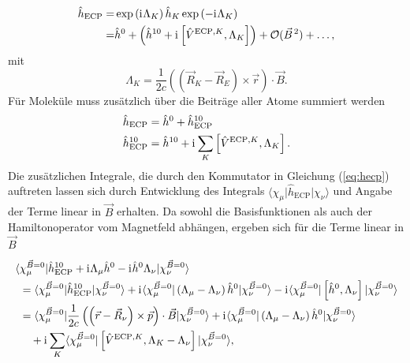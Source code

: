 	\begin{equation}
	\begin{aligned}
	\hat{h}_{\textrm{ECP}}=&\exp\left(\mathrm{i}\mkern1mu\Lambda_K\right)\hat{h}_K\exp\left(-\mathrm{i}\mkern1mu\Lambda_K\right)\\
	=&\hat{h}^0+\left(\hat{h}^{10}+\mathrm{i}\mkern1mu\left[\hat{V}^{\textrm{ECP},K},\Lambda_K\right]\right)+\mathcal{O}(\vec{B}^{\,2})+\dotsc,
	\end{aligned}
	\end{equation}
	mit
	\begin{equation}
	\Lambda_K=\frac{1}{2c}\left(\left(\vec{R}_K-\vec{R}_E\right)\times\vec{r}\right)\cdot\vec{B}.
	\end{equation}
	Für Moleküle muss zusätzlich über die Beiträge aller Atome summiert werden
	\begin{equation}\label{eq:hecp}
	\begin{aligned}
	&\hat{h}_{\textrm{ECP}}=\hat{h}^0+\hat{h}_{\textrm{ECP}}^{10}\\
	&\hat{h}_{\textrm{ECP}}^{10}=\hat{h}^{10}+\mathrm{i}\mkern1mu\sum_K\left[\hat{V}^{\textrm{ECP},K},\Lambda_K\right].
	\end{aligned}
	\end{equation}	 
	Die zusätzlichen Integrale, die durch den Kommutator in Gleichung (\ref{eq:hecp}) auftreten lassen sich durch Entwicklung des Integrals $\langle\chi_\mu\vert\hat{h}_{\textrm{ECP}}\vert\chi_\nu\rangle$ und Angabe der Terme linear in $\vec{B}$ erhalten. Da sowohl die Basisfunktionen als auch der Hamiltonoperator vom Magnetfeld abhängen, ergeben sich für die Terme linear in $\vec{B}$
	
	\begin{equation}\label{eq:linearinb}
	\begin{aligned}
	\langle &\chi_\mu^{\vec{B}=0}\vert\hat{h}_{\textrm{ECP}}^{10}+\mathrm{i}\mkern1mu\Lambda_\mu\hat{h}^0-\mathrm{i}\mkern1mu\hat{h}^0\Lambda_\nu\vert\chi_\nu^{\vec{B}=0}\rangle\\
	&=\langle \chi_\mu^{\vec{B}=0}\vert\hat{h}_{\textrm{ECP}}^{10}\vert\chi_\nu^{\vec{B}=0}\rangle+\mathrm{i}\mkern1mu\langle\chi_\mu^{\vec{B}=0}\vert\left(\Lambda_\mu -\Lambda_\nu\right)\hat{h}^0\vert\chi_\nu^{\vec{B}=0}\rangle-\mathrm{i}\mkern1mu\langle\chi_\mu^{\vec{B}=0}\vert\left[\hat{h}^0 ,\Lambda_\nu\right]\vert\chi_\nu^{\vec{B}=0}\rangle\\
    &=\langle \chi_\mu^{\vec{B}=0}\vert\frac{1}{2c}\left(\left(\vec{r}-\vec{R}_\nu\right)\times\vec{p}\right)\cdot\vec{B}\vert\chi_\nu^{\vec{B}=0}\rangle
    +\mathrm{i}\mkern1mu\langle\chi_\mu^{\vec{B}=0}\vert\left(\Lambda_\mu -\Lambda_\nu\right)\hat{h}^0\vert\chi_\nu^{\vec{B}=0}\rangle\\
    &\quad+\mathrm{i}\mkern1mu\sum_K\langle \chi_\mu^{\vec{B}=0}\vert\left[\hat{V}^{\textrm{ECP},K},\Lambda_K-\Lambda_\nu\right]\vert\chi_\nu^{\vec{B}=0}\rangle,
	\end{aligned}
	\end{equation}
	
